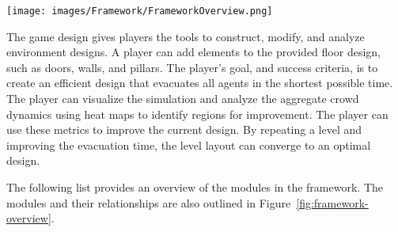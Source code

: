 \begin{figure*}
	\centering  \texttt{[image: images/Framework/FrameworkOverview.png]}
	\caption{\label{fig:framework-overview}The Game Framework overview}
\end{figure*}

The game design gives players the tools to construct, modify, and analyze environment designs.  A player can add elements to the provided floor design, such as doors, walls, and pillars. The player's goal, and success criteria, is to create an efficient design that evacuates all agents in the shortest possible time. The player can visualize the simulation and analyze the aggregate crowd dynamics using heat maps to identify regions for improvement. The player can use these metrics to improve the current design. By repeating a level and improving the evacuation time, the level layout can converge to an optimal design.

The following list provides an overview of the modules in the framework. The modules and their relationships are also outlined in Figure~\ref{fig:framework-overview}.

